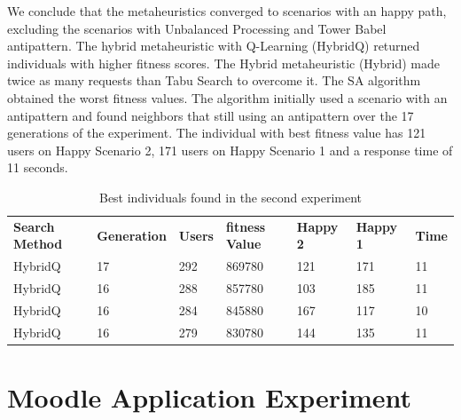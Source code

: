 We conclude that the metaheuristics converged to scenarios with an happy path, excluding the scenarios with Unbalanced Processing and Tower Babel antipattern. The hybrid metaheuristic with Q-Learning (HybridQ) returned individuals with higher fitness scores. The Hybrid metaheuristic (Hybrid) made twice as many requests than Tabu Search to overcome it. The SA algorithm obtained the worst fitness values. The algorithm initially used a scenario with an antipattern and found neighbors that still using an antipattern over the 17 generations of the experiment. The individual with best fitness value has 121 users on Happy Scenario 2, 171 users on Happy Scenario 1 and a response time of 11 seconds.

\begin{table}[h]
\centering
\caption{Best individuals found in the second experiment}
\label{tab:bestindividuals2}
\begin{tabular}{lllllll}
\rowcolor[HTML]{FFCCC9} 
\textbf{Search Method} & \textbf{Generation} & \textbf{Users} & \textbf{fitness Value} & \textbf{Happy 2} & \textbf{Happy 1} & \textbf{Time} \\ 
\multicolumn{1}{l}{HybridQ} & \multicolumn{1}{l}{17} & \multicolumn{1}{l}{292} & \multicolumn{1}{l}{869780}  & \multicolumn{1}{l}{121} & \multicolumn{1}{l}{171} & \multicolumn{1}{l}{11} \\ 
\multicolumn{1}{l}{HybridQ} & \multicolumn{1}{l}{16} & \multicolumn{1}{l}{288} & \multicolumn{1}{l}{857780} &  \multicolumn{1}{l}{103} & \multicolumn{1}{l}{185} & \multicolumn{1}{l}{11} \\ 
\multicolumn{1}{l}{HybridQ} & \multicolumn{1}{l}{16} & \multicolumn{1}{l}{284} & \multicolumn{1}{l}{845880} &  \multicolumn{1}{l}{167} & \multicolumn{1}{l}{117} & \multicolumn{1}{l}{10} \\ 
\multicolumn{1}{l}{HybridQ} & \multicolumn{1}{l}{16} & \multicolumn{1}{l}{279} & \multicolumn{1}{l}{830780} &  \multicolumn{1}{l}{144} & \multicolumn{1}{l}{135} & \multicolumn{1}{l}{11} \\ 
\end{tabular}
\end{table}

\section{Moodle Application Experiment}

